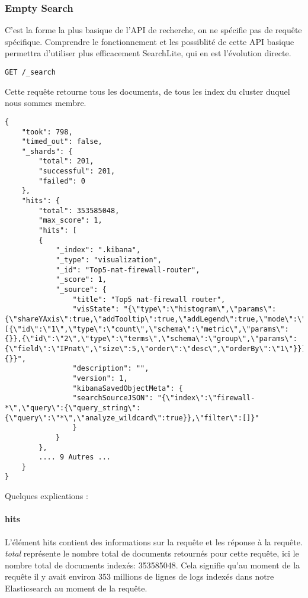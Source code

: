 \subsubsection{Empty Search}
C'est la forme la plus basique de l'API de recherche, on ne spécifie pas de requête
spécifique. Comprendre le fonctionnement et les possiblité de cette API basique 
permettra d'utiliser plus efficacement SearchLite, qui en est l'évolution directe.


\begin{lstlisting}[style=code,label={lst:APIsearchemptyexample1},caption={le "Hello World" de la recherche}]
GET /_search
\end{lstlisting}

Cette requête retourne tous les documents, de tous les index du cluster duquel nous
sommes membre.

\begin{lstlisting}[style=code,label={lst:APIsearchemptyexample2},caption={Réponse type à notre requête précédente}]
{
    "took": 798,
    "timed_out": false,
    "_shards": {
        "total": 201,
        "successful": 201,
        "failed": 0
    },
    "hits": {
        "total": 353585048,
        "max_score": 1,
        "hits": [
        {
            "_index": ".kibana",
            "_type": "visualization",
            "_id": "Top5-nat-firewall-router",
            "_score": 1,
            "_source": {
                "title": "Top5 nat-firewall router",
                "visState": "{\"type\":\"histogram\",\"params\":{\"shareYAxis\":true,\"addTooltip\":true,\"addLegend\":true,\"mode\":\"stacked\",\"defaultYExtents\":false},\"aggs\":[{\"id\":\"1\",\"type\":\"count\",\"schema\":\"metric\",\"params\":{}},{\"id\":\"2\",\"type\":\"terms\",\"schema\":\"group\",\"params\":{\"field\":\"IPnat\",\"size\":5,\"order\":\"desc\",\"orderBy\":\"1\"}}],\"listeners\":{}}",
                "description": "",
                "version": 1,
                "kibanaSavedObjectMeta": {
                "searchSourceJSON": "{\"index\":\"firewall-*\",\"query\":{\"query_string\":{\"query\":\"*\",\"analyze_wildcard\":true}},\"filter\":[]}"
                }
            }
        },
        .... 9 Autres ...
    }
}
\end{lstlisting}

Quelques explications :

\paragraph{hits}
L'élément hits contient des informations sur la requête et les réponse à la requête.
\textit{total} représente le nombre total de documents retournés pour cette requête, ici le 
nombre total de documents indexés: 353585048. 
Cela signifie qu'au moment de la requête il y avait environ 353 millions de lignes
de logs indexés dans notre Elasticsearch au moment de la requête.

